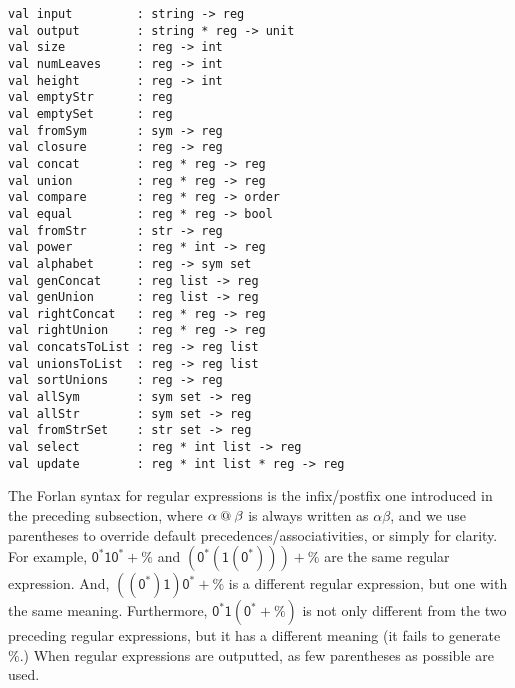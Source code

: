 \begin{verbatim}
val input         : string -> reg
val output        : string * reg -> unit
val size          : reg -> int
val numLeaves     : reg -> int
val height        : reg -> int
val emptyStr      : reg
val emptySet      : reg
val fromSym       : sym -> reg
val closure       : reg -> reg
val concat        : reg * reg -> reg
val union         : reg * reg -> reg
val compare       : reg * reg -> order
val equal         : reg * reg -> bool
val fromStr       : str -> reg
val power         : reg * int -> reg
val alphabet      : reg -> sym set
val genConcat     : reg list -> reg
val genUnion      : reg list -> reg
val rightConcat   : reg * reg -> reg
val rightUnion    : reg * reg -> reg
val concatsToList : reg -> reg list
val unionsToList  : reg -> reg list
val sortUnions    : reg -> reg
val allSym        : sym set -> reg
val allStr        : sym set -> reg
val fromStrSet    : str set -> reg
val select        : reg * int list -> reg
val update        : reg * int list * reg -> reg
\end{verbatim}

The Forlan syntax for regular expressions is the infix/postfix one
%
%
introduced in the preceding subsection, where $\alpha\mathbin{@}\beta$
is always written as $\alpha\beta$, and we use parentheses
to override default precedences/associativities, or simply
for clarity.
For example, $\mathsf{0^*10^*+\%}$ and $\mathsf{(0^*(1(0^*)))+\%}$
are the same regular expression.  And, $\mathsf{((0^*)1)0^*+\%}$
is a different regular expression, but one with the same meaning.
Furthermore, $\mathsf{0^*1(0^*+\%)}$ is not only different from
the two preceding regular expressions, but it has a different
meaning (it fails to generate $\%$.)
When regular expressions are outputted, as few parentheses as
possible are used.


